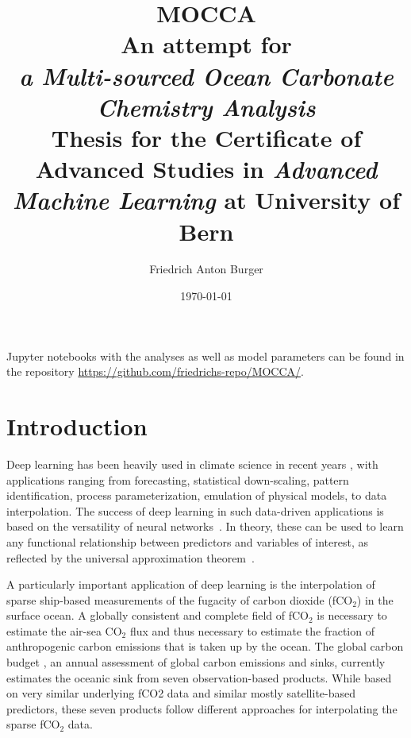 \documentclass{article}
\title{\textbf{MOCCA} \\[0.75cm]
\large An attempt for \\[0.25cm] \textit{a Multi-sourced Ocean Carbonate Chemistry Analysis} \\[2.5cm]
Thesis for the Certificate of Advanced Studies in \textit{Advanced Machine Learning} at University of Bern  \\[2.5cm]
}
\author{Friedrich Anton Burger}
\date{\today}
\begin{document}
	
	\maketitle
	\thispagestyle{empty}
	\vspace{6cm}
	\noindent
	\begin{center}
		Jupyter notebooks with the analyses as well as model parameters can be found in the repository \url{https://github.com/friedrichs-repo/MOCCA/}.
	\end{center}
	
	
	\newpage
	
	\tableofcontents
	\section{Introduction}
	Deep learning has been heavily used in climate science in recent years \citep{reichstein2019}, with applications ranging from forecasting, statistical down-scaling, pattern identification, process parameterization, emulation of physical models, to data interpolation. The success of deep learning in such data-driven applications is based on the versatility of neural networks~\citep{goodfellow2016}. In theory, these can be used to learn any functional relationship between predictors and variables of interest, as reflected by the universal approximation theorem~\cite{hornik1989}.
	
	A particularly important application of deep learning is the interpolation of sparse ship-based measurements of the fugacity of carbon dioxide (fCO$_2$) in the surface ocean. A globally consistent and complete field of fCO$_2$ is necessary to estimate the air-sea CO$_2$ flux and thus necessary to estimate the fraction of anthropogenic carbon emissions that is taken up by the ocean. The global carbon budget \citep{friedlingstein2023}, an annual assessment of global carbon emissions and sinks, currently estimates the oceanic sink from seven observation-based products. While based on very similar underlying fCO2 data and similar mostly satellite-based predictors, these seven products follow different approaches for interpolating the sparse fCO$_2$ data. 
	
\end{document}
